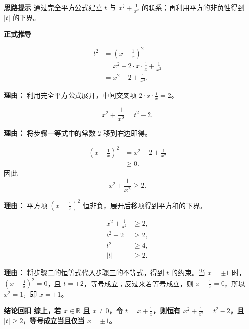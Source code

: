 \begin{proofbox}
	\textbf{\textcolor{CProof}{思路提示}}
	通过完全平方公式建立 $t$ 与 $x^2+\frac{1}{x^2}$ 的联系；再利用平方的非负性得到 $|t|$ 的下界。

	\medskip
	\textbf{\textcolor{CProof}{正式推导}}
	\begin{description}[style=nextline, leftmargin=2.8em, labelsep=0.5em, itemsep=0.55em]
		\item[\textbf{步骤一（平方展开）：}]
		      \[
			      \begin{aligned}
				      t^2
				       & = \left(x+\frac{1}{x}\right)^2                   \\
				       & = x^2 + 2\cdot x\cdot\frac{1}{x} + \frac{1}{x^2} \\
				       & = x^2 + 2 + \frac{1}{x^2}.
			      \end{aligned}
		      \]
		      \par\textbf{理由：} 利用完全平方公式展开，中间交叉项 $2\cdot x\cdot\frac{1}{x}=2$。
		\item[\textbf{步骤二（变形恒等）：}]
		      \[
			      x^2+\frac{1}{x^2} = t^2 - 2.
		      \]
		      \par\textbf{理由：} 将步骤一等式中的常数 $2$ 移到右边即得。
		\item[\textbf{步骤三（平方非负）：}]
		      \[
			      \begin{aligned}
				      \left(x-\frac{1}{x}\right)^2
				       & = x^2 - 2 + \frac{1}{x^2} \\
				       & \ge 0.
			      \end{aligned}
		      \]
		      因此
		      \[
			      x^2+\frac{1}{x^2}\ge 2.
		      \]
		      \par\textbf{理由：} 平方项 $\left(x-\frac{1}{x}\right)^2$ 恒非负，展开后移项得到平方和的下界。
		\item[\textbf{步骤四（代入取等）：}]
		      \[
			      \begin{aligned}
				      x^2+\frac{1}{x^2} & \ge 2, \\
				      t^2-2             & \ge 2, \\
				      t^2               & \ge 4, \\
				      |t|               & \ge 2.
			      \end{aligned}
		      \]
		      \par\textbf{理由：} 将步骤二的恒等式代入步骤三的不等式，得到 $t$ 的约束。当 $x=\pm 1$ 时，$\left(x-\frac{1}{x}\right)^2=0$，且 $t=\pm 2$，等号成立；反过来若等号成立，则 $x-\frac{1}{x}=0$，所以 $x^2=1$，即 $x=\pm 1$。
	\end{description}

	\medskip
	\textbf{\textcolor{CProof}{结论回扣}}
	\textbf{综上，若 $x\in\mathbb{R}$ 且 $x\neq 0$，令 $t=x+\frac{1}{x}$，则恒有 $x^2+\frac{1}{x^2}=t^2-2$，且 $|t|\ge 2$，等号成立当且仅当 $x=\pm 1$。}
\end{proofbox}